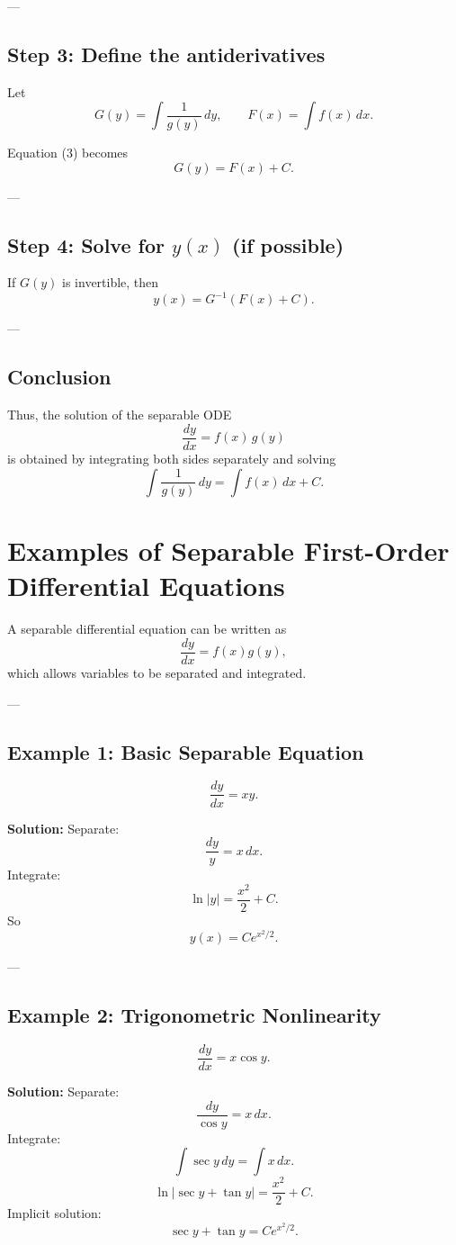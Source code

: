 \documentclass[12pt]{book}
\begin{document}
---

\subsection*{Step 3: Define the antiderivatives}
Let
\[
G(y) = \int \frac{1}{g(y)}\,dy, 
\qquad
F(x) = \int f(x)\,dx.
\]

Equation (3) becomes
\[
G(y) = F(x) + C. \tag{4}
\]

---

\subsection*{Step 4: Solve for $y(x)$ (if possible)}
If $G(y)$ is invertible, then
\[
y(x) = G^{-1}(F(x) + C). \tag{5}
\]

---

\subsection*{Conclusion}
Thus, the solution of the separable ODE
\[
\frac{dy}{dx} = f(x)\,g(y)
\]
is obtained by integrating both sides separately and solving
\[
\int \frac{1}{g(y)}\,dy = \int f(x)\,dx + C.
\]

\section*{Examples of Separable First-Order Differential Equations}

A separable differential equation can be written as
\[
\frac{dy}{dx} = f(x) g(y),
\]
which allows variables to be separated and integrated.

---

\subsection*{Example 1: Basic Separable Equation}
\[
\frac{dy}{dx} = x y.
\]

\textbf{Solution:} Separate:
\[
\frac{dy}{y} = x\,dx.
\]
Integrate:
\[
\ln|y| = \frac{x^2}{2} + C.
\]
So
\[
y(x) = C e^{x^2/2}.
\]

---

\subsection*{Example 2: Trigonometric Nonlinearity}
\[
\frac{dy}{dx} = x \cos y.
\]

\textbf{Solution:} Separate:
\[
\frac{dy}{\cos y} = x\,dx.
\]
Integrate:
\[
\int \sec y \, dy = \int x\,dx.
\]
\[
\ln|\sec y + \tan y| = \frac{x^2}{2} + C.
\]
Implicit solution:
\[
\sec y + \tan y = C e^{x^2/2}.
\]
\end{document}
